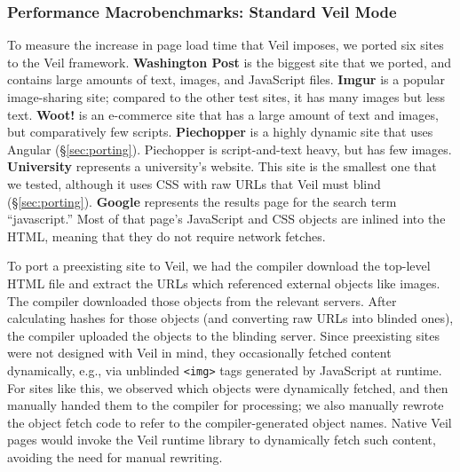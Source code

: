 \subsubsection{Performance Macrobenchmarks: Standard Veil Mode}
\label{sec:macrobench}

To measure the increase in page load
time that Veil imposes, we ported six sites
to the Veil framework.  \textbf{Washington Post}
is the biggest site that we ported, and contains
large amounts of text, images, and JavaScript
files. \textbf{Imgur} is a popular image-sharing
site; compared to the other test sites, it has
many images but less text. \textbf{Woot!} is an
e-commerce site that has a large amount of text
and images, but comparatively few scripts.
\textbf{Piechopper} is a highly dynamic site that
uses Angular (\S\ref{sec:porting}). Piechopper is
script-and-text heavy, but has few images.
\textbf{University} represents a university's
website. This site is the smallest
one that we tested, although it uses CSS with raw
URLs that Veil must blind (\S\ref{sec:porting}).
\textbf{Google} represents the results page for
the search term ``javascript.''  Most of that page's
JavaScript and CSS objects are inlined into
the HTML, meaning that they do not require
network fetches. 

To port a preexisting site to Veil, we had the
compiler download the top-level HTML file and
extract the URLs which referenced external objects like
images. The compiler downloaded those objects from
the relevant servers. After calculating hashes
for those objects (and converting raw URLs into
blinded ones), the compiler uploaded the objects
to the blinding server. Since preexisting sites
were not designed with Veil in mind, they
occasionally fetched content dynamically, e.g.,
via unblinded \texttt{<img>} tags generated by
JavaScript at runtime. For sites like this, we
observed which objects were dynamically fetched,
and then manually handed them to the compiler
for processing; we also manually rewrote the
object fetch code to refer to the compiler-generated
object names. Native Veil pages would invoke
the Veil runtime library to dynamically fetch
such content, avoiding the need for manual
rewriting.

